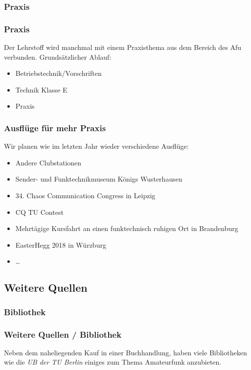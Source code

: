 \subsubsection{Praxis}

\begin{frame}
    \frametitle{Praxis}

    Der Lehrstoff wird manchmal mit einem Praxisthema aus dem Bereich des Afu
    verbunden. Grundsätzlicher Ablauf:

    \begin{itemize}
        \item Betriebstechnik/Vorschriften
        \item Technik Klasse E
        \item Praxis
    \end{itemize}
\end{frame}

\begin{frame}
  \frametitle{Ausflüge für mehr Praxis}

  Wir planen wie im letzten Jahr wieder verschiedene Ausflüge:

  \begin{itemize}
    \item Andere Clubstationen
    \item Sender- und Funktechnikmuseum Königs Wusterhausen
    \item 34. Chaos Communication Congress in Leipzig
    \item CQ TU Contest
    \item Mehrtägige Kursfahrt an einen funktechnisch ruhigen Ort in Brandenburg
    \item EasterHegg 2018 in Würzburg
    \item \ldots
  \end{itemize}
\end{frame}


\subsection{Weitere Quellen}

\subsubsection{Bibliothek}
\begin{frame}
    \frametitle{Weitere Quellen / Bibliothek}

    Neben dem naheliegenden Kauf in einer Buchhandlung, haben viele Bibliotheken
    wie die \emph{UB der TU Berlin} \hyperlink{refs}{\cite{ub}} einiges zum Thema
    Amateurfunk anzubieten.

\end{frame}

